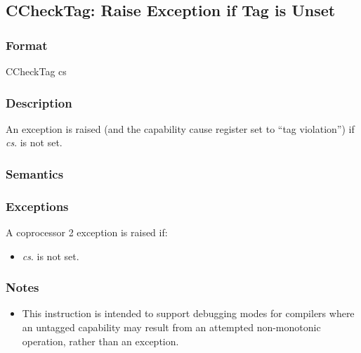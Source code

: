 \clearpage
{}
{}
\subsection*{CCheckTag: Raise Exception if Tag is Unset}

\subsubsection*{Format}

CCheckTag cs

\begin{center}
\end{center}

\subsubsection*{Description}

An exception is raised (and the capability cause register set to ``tag
violation'') if \emph{cs}.\ctag{} is not set.

\subsubsection*{Semantics}

\subsubsection*{Exceptions}

A coprocessor 2 exception is raised if:

\begin{itemize}
\item
\emph{cs}.\ctag{} is not set.
\end{itemize}

\subsubsection{Notes}

\begin{itemize}
\item
This instruction is intended to support debugging modes for compilers where
an untagged capability may result from an attempted non-monotonic operation,
rather than an exception.
\end{itemize}
